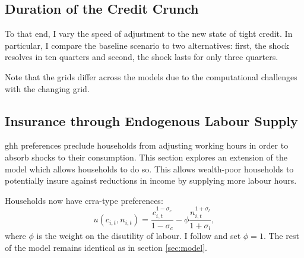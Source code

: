 \documentclass[12pt]{article} %
\numberwithin{equation}{section} %
\numberwithin{figure}{section}
\numberwithin{table}{section}
\begin{document}
\subsection{Duration of the Credit Crunch}
\label{sec:sensitivity-persistence}

To that end, I vary the speed of adjustment to the new state of tight credit. In particular, I compare the baseline scenario to two alternatives: first, the shock resolves in ten quarters and second, the shock lasts for only three quarters.

Note that the grids differ across the models due to the computational challenges with the changing grid. 

\subsection{Insurance through Endogenous Labour Supply}
\label{sec:sensitivity-end-labour}

\Gls{ghh} preferences preclude households from adjusting working hours in order to absorb shocks to their consumption. This section explores an extension of the model which allows households to do so. This allows wealth-poor households to potentially insure against reductions in income by supplying more labour hours.

Households now have \Gls{crra}-type preferences:
\begin{equation}
    u(c_{i,t}, n_{i,t}) = \frac{c_{i,t}^{1-\sigma_c}}{1-\sigma_c} - \phi \frac{n_{i,t}^{1+\sigma_l}}{1+\sigma_l}, \label{eq:hh-crra-utility}
\end{equation}
where $\phi$ is the weight on the disutility of labour. I follow \textcite{mckay2016} and set $\phi=1$. The rest of the model remains identical as in section \ref{sec:model}.


\end{document}
